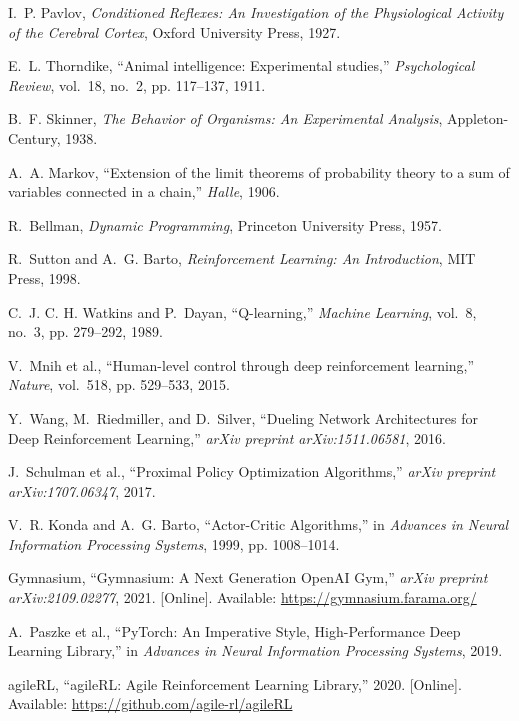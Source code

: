 \documentclass[compsoc]{IEEEtran}
\begin{document}
{{{\begin{thebibliography}{12}
I.~P. Pavlov, \emph{Conditioned Reflexes: An Investigation of the Physiological Activity of the Cerebral Cortex}, Oxford University Press, 1927.

E.~L. Thorndike, ``Animal intelligence: Experimental studies,'' \emph{Psychological Review}, vol.~18, no.~2, pp. 117--137, 1911.

B.~F. Skinner, \emph{The Behavior of Organisms: An Experimental Analysis}, Appleton-Century, 1938.

A.~A. Markov, ``Extension of the limit theorems of probability theory to a sum of variables connected in a chain,'' \emph{Halle}, 1906.

R.~Bellman, \emph{Dynamic Programming}, Princeton University Press, 1957.

R.~Sutton and A.~G. Barto, \emph{Reinforcement Learning: An Introduction}, MIT Press, 1998.

C.~J. C. H. Watkins and P.~Dayan, ``Q-learning,'' \emph{Machine Learning}, vol.~8, no.~3, pp. 279--292, 1989.

V.~Mnih et al., ``Human-level control through deep reinforcement learning,'' \emph{Nature}, vol.~518, pp. 529--533, 2015.

Y.~Wang, M.~Riedmiller, and D.~Silver, ``Dueling Network Architectures for Deep Reinforcement Learning,'' \emph{arXiv preprint arXiv:1511.06581}, 2016.

J.~Schulman et al., ``Proximal Policy Optimization Algorithms,'' \emph{arXiv preprint arXiv:1707.06347}, 2017.

V.~R. Konda and A.~G. Barto, ``Actor-Critic Algorithms,'' in \emph{Advances in Neural Information Processing Systems}, 1999, pp. 1008--1014.

Gymnasium, ``Gymnasium: A Next Generation OpenAI Gym,'' \emph{arXiv preprint arXiv:2109.02277}, 2021. [Online]. Available: \url{https://gymnasium.farama.org/}

A.~Paszke et al., ``PyTorch: An Imperative Style, High-Performance Deep Learning Library,'' in \emph{Advances in Neural Information Processing Systems}, 2019.

agileRL, ``agileRL: Agile Reinforcement Learning Library,'' 2020. [Online]. Available: \url{https://github.com/agile-rl/agileRL}


\end{thebibliography}}}}
\end{document}
